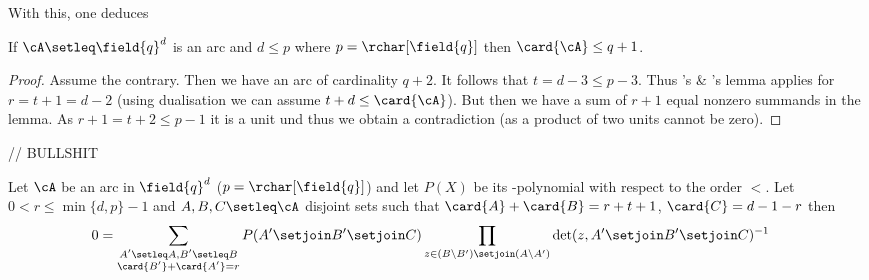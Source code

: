 With this, one deduces

\begin{corollary}\label{cor:mdsconjpcase}
  If $\cA\setleq \field{q}^d$ is an arc and $d\leq p$ where $p=\rchar[\field{q}]$ then $\card{\cA}\leq q+1$.
\end{corollary}

\begin{proof}
  Assume the contrary. Then we have an arc of cardinality $q+2$. It follows that $t=d-3\leq p-3$. Thus 's \& 's lemma applies for $r=t+1=d-2$ (using dualisation we can assume $t+d\leq \card{\cA}$). But then we have a sum of $r+1$ equal nonzero summands in the lemma.
  As $r+1=t+2\leq p-1$ it is a unit und thus we obtain a contradiction
  (as a product of two units cannot be zero).
\end{proof}

// BULLSHIT
\begin{lemma} 
  Let $\cA$ be an arc in $\field{q}^d$ ($p=\rchar[\field{q}]$) and let
  $P(X)$ be its -polynomial with respect to the order
  $<$. Let $0<r\leq\min\{d,p\}-1$ and $A,B,C\setleq \cA$ disjoint sets
  such that $\card{A}+\card{B}=r+t+1$, $\card{C}=d-1-r$ then
  \begin{align}
    0 &= \sum_{\substack{A'\setleq A, B'\setleq B\\
        \card{B'}+\card{A'}=r}}{P(A'\setjoin B'\setjoin C)\prod_{z\in
        (B\setminus B')\setjoin (A\setminus A')}{\det(z,A'\setjoin B'\setjoin C)^{-1}}}
  \end{align}
\end{lemma}

